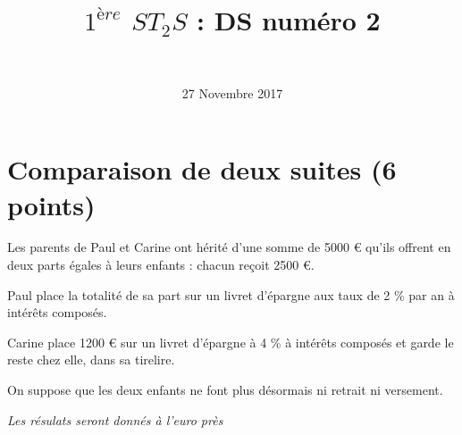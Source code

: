 \documentclass[a4paper,11pt]{exam}
\author{\ }
\date{27 Novembre 2017}
\title{$1^{ère}$ $ST_2S$ : DS num\'ero 2}
\begin{document}
%	

	\maketitle

\section{Comparaison de deux suites (6 points)}

Les parents de Paul et Carine ont hérité d'une somme de \num{5000} € qu'ils offrent en deux parts égales à leurs enfants : chacun reçoit \num{2500} €.

Paul place la totalité de sa part sur un livret d'épargne aux taux de 2 \% par an à intérêts composés.

Carine place \num{1200} € sur un livret d'épargne à 4 \% à intérêts composés et garde le reste chez elle, dans sa tirelire.

On suppose que les deux enfants ne font plus désormais ni retrait ni versement.

\textit{Les résulats seront donnés à l'euro près}
\end{document}
